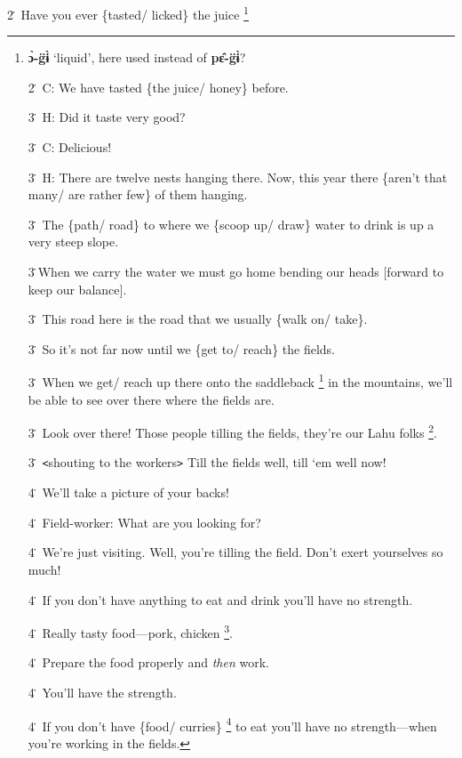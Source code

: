 2\. Have you ever \{tasted/ licked\} the juice \footnote{\textbf{ɔ̀-g̈ɨ̀} `liquid', here used instead of \textbf{pɛ̂-g̈ɨ̀}?

2\. C: We have tasted \{the juice/ honey\} before.

3\. H: Did it taste very good?

3\. C: Delicious!

3\. H: There are twelve nests hanging there. Now, this year there \{aren't that
many/ are rather few\} of them hanging.

3\. The \{path/ road\} to where we \{scoop up/ draw\} water to drink is up a very
steep slope.

3\.When we carry the water we must go home bending our heads [forward to keep our
balance].

3\. This road here is the road that we usually \{walk on/ take\}.

3\. So it's not far now until we \{get to/ reach\} the fields.

3\. When we get/ reach up there onto the saddleback \footnote{\textbf{qā-lèʔ}: `a relatively flat or low part of a mountain; saddleback;} in the mountains, we'll
be able to see over there where the fields are.

3\. Look over there! Those people tilling the fields, they're our Lahu folks \footnote{\textbf{Lâhū-yâ:} lit. ``Lahu sons; Lahu children.'' cf. Heb. B'nei Yisrael.}.

3\. \texttt{<}shouting to the workers\texttt{>} Till the fields well, till `em
well now!

4\. We'll take a picture of your backs!

4\. Field-worker: What are you looking for?

4\. We're just visiting. Well, you're tilling the field. Don't exert yourselves
so much!

4\. If you don't have anything to eat and drink you'll have no strength.

4\. Really tasty food---pork, chicken \footnote{H. is gently teasing them. Meat was something eaten only on special occasions,}.

4\. Prepare the food properly and \textit{then} work.

4\. You'll have the strength.

4\. If you don't have \{food/ curries\} \footnote{\textbf{ɔ̄-chî}: lit. ``rice-lifter'' (\textbf{chî }`lift up'), that which} to eat you'll have no strength---when
you're working in the fields.

}
